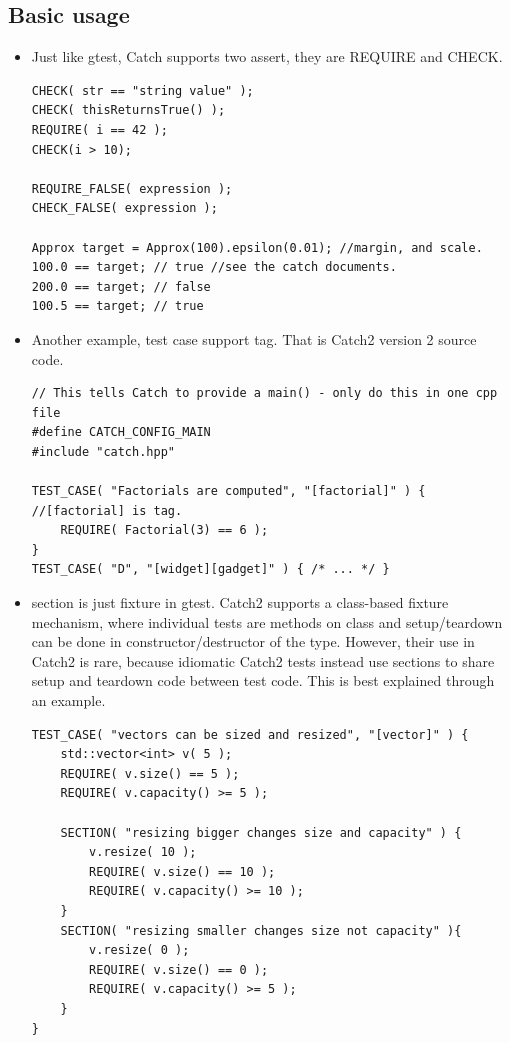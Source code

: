 \documentclass[a4paper,11pt,twoside]{book}
\begin{document}
\subsection{Basic usage}
\begin{itemize}
	
	\item Just like gtest, Catch supports two assert, they are REQUIRE and CHECK.
	
\begin{lstlisting}
CHECK( str == "string value" );
CHECK( thisReturnsTrue() );
REQUIRE( i == 42 );
CHECK(i > 10);

REQUIRE_FALSE( expression );
CHECK_FALSE( expression );

Approx target = Approx(100).epsilon(0.01); //margin, and scale. 
100.0 == target; // true //see the catch documents.
200.0 == target; // false
100.5 == target; // true
\end{lstlisting}

	\item Another example, test case support tag. That is Catch2 version 2 source code. 
\begin{lstlisting}
// This tells Catch to provide a main() - only do this in one cpp file
#define CATCH_CONFIG_MAIN  
#include "catch.hpp"
 
TEST_CASE( "Factorials are computed", "[factorial]" ) { //[factorial] is tag.
	REQUIRE( Factorial(3) == 6 );    
}
TEST_CASE( "D", "[widget][gadget]" ) { /* ... */ }
\end{lstlisting}

	\item section is just fixture in gtest.  Catch2 supports a class-based fixture mechanism, where individual tests are methods on class and setup/teardown can be done in constructor/destructor of the type. However, their use in Catch2 is rare, because idiomatic Catch2 tests instead use sections to share setup and teardown code between test code. This is best explained through an example.
\begin{lstlisting}
TEST_CASE( "vectors can be sized and resized", "[vector]" ) {
	std::vector<int> v( 5 );    
	REQUIRE( v.size() == 5 );    
	REQUIRE( v.capacity() >= 5 );  
	  
	SECTION( "resizing bigger changes size and capacity" ) {
		v.resize( 10 );        
		REQUIRE( v.size() == 10 );        
		REQUIRE( v.capacity() >= 10 );    
	}    
	SECTION( "resizing smaller changes size not capacity" ){
		v.resize( 0 );        
		REQUIRE( v.size() == 0 );        
		REQUIRE( v.capacity() >= 5 );    
	}    
}
\end{lstlisting}


\end{itemize}
\end{document}
